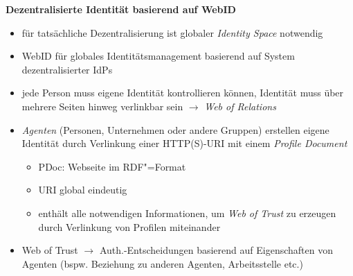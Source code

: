 \vspace{1cm}

\textbf{Dezentralisierte Identität basierend auf WebID}
\begin{itemize}
    \item für tatsächliche Dezentralisierung ist globaler \emph{Identity Space} notwendig~\cite{sambraSolidPlatformDecentralized2016}
    \item WebID für globales Identitätsmanagement basierend auf System dezentralisierter IdPs~\cite{sambraSolidPlatformDecentralized2016}
    \item jede Person muss eigene Identität kontrollieren können, Identität muss über mehrere Seiten hinweg verlinkbar sein $\to$ \emph{Web of Relations}~\cite{sambraSolidPlatformDecentralized2016}
    \item \emph{Agenten} (Personen, Unternehmen oder andere Gruppen) erstellen eigene Identität durch Verlinkung einer HTTP(S)-URI mit einem \emph{Profile Document}~\cite{sambraSolidPlatformDecentralized2016}
    \begin{itemize}
        \item PDoc: Webseite im RDF"=Format~\cite{sambraSolidPlatformDecentralized2016}
        \item URI global eindeutig~\cite{mecklerWebLinkedData2023}
        \item enthält alle notwendigen Informationen, um \emph{Web of Trust} zu erzeugen durch Verlinkung von Profilen miteinander~\cite{sambraSolidPlatformDecentralized2016}
    \end{itemize}
    \item Web of Trust $\to$ Auth.-Entscheidungen basierend auf Eigenschaften von Agenten (bspw. Beziehung zu anderen Agenten, Arbeitsstelle etc.)~\cite{sambraSolidPlatformDecentralized2016}
\end{itemize}

\vspace{1cm}


